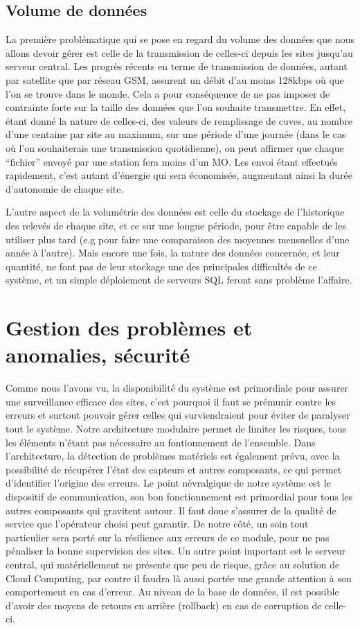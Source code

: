 \subsection{Volume de données}

La première problématique qui se pose en regard du volume des données que nous allons devoir gérer est celle de la transmission de celles-ci depuis les sites jusqu'au serveur central. Les progrès récents en terme de transmission de données, autant par satellite que par réseau GSM, assurent un débit d'au moins 128kbps où que l'on se trouve dans le monde. Cela a pour conséquence de ne pas imposer de contrainte forte sur la taille des données que l'on souhaite transmettre. En effet, étant donné la nature de celles-ci, des valeurs de remplissage de cuves, au nombre d'une centaine par site au maximum, sur une période d'une journée (dans le cas où l'on souhaiterais une transmission quotidienne), on peut affirmer que chaque ``fichier'' envoyé par une station fera moins d'un MO. Les envoi étant effectués rapidement, c'est autant d'énergie qui sera économisée, augmentant ainsi la durée d'autonomie de chaque site.

L'autre aspect de la volumétrie des données est celle du stockage de l'historique des relevés de chaque site, et ce sur une longue période, pour être capable de les utiliser plus tard (e.g pour faire une comparaison des moyennes mensuelles d'une année à l'autre). Mais encore une fois, la nature des données concernée, et leur quantité, ne font pas de leur stockage une des principales difficultés de ce système, et un simple déploiement de serveurs SQL feront sans problème l'affaire.

\section{Gestion des problèmes et anomalies, sécurité}
Comme nous l'avons vu, la disponibilité du système est primordiale pour assurer une surveillance efficace des sites, c'est pourquoi il faut se prémunir contre les erreurs et surtout pouvoir gérer celles qui surviendraient pour éviter de paralyser tout le système. Notre architecture modulaire permet de limiter les risques, tous les éléments n'étant pas nécessaire au fontionnement de l'ensemble.
Dans l'architecture, la détection de problèmes matériels est également prévu, avec la possibilité de récupérer l'état des capteurs et autres composants, ce qui permet d'identifier l'origine des erreurs.
Le point névralgique de notre système est le dispositif de communication, son bon fonctionnement est primordial pour tous les autres composants qui gravitent autour. Il faut donc s'assurer de la qualité de service que l'opérateur choisi peut garantir. De notre côté, un soin tout particulier sera porté sur la résilience aux erreurs de ce module, pour ne pas pénaliser la bonne supervision des sites.
Un autre point important est le serveur central, qui matériellement ne présente que peu de risque, grâce au solution de Cloud Computing, par contre il faudra là aussi portée une grande attention à son comportement en cas d'erreur. Au niveau de la base de données, il est possible d'avoir des moyens de retours en arrière (rollback) en cas de corruption de celle-ci.


